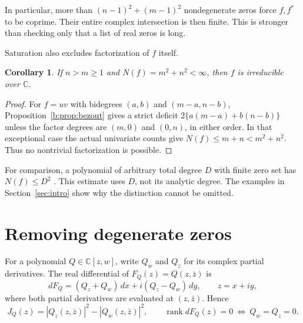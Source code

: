 \documentclass[UTF8,11pt]{ctexart}
\newtheorem{cor}[thm]{Corollary}
\theoremstyle{definition}
\numberwithin{equation}{section}
\newcommand{\C}{\mathbb C}\newcommand{\R}{\mathbb R}
\newcommand{\dd}{\,d}\newcommand{\av}{\textup{author version}}
\DeclareMathOperator{\rank}{rank}\DeclareMathOperator{\tr}{tr}\DeclareMathOperator{\Tr}{Tr}
\begin{document}
In particular, more than $(n-1)^2+(m-1)^2$ nondegenerate zeros force $f,f^*$ to be coprime. Their entire complex intersection is then finite. This is stronger than checking only that a list of real zeros is long.

Saturation also excludes factorization of $f$ itself.
\begin{cor}\label{b:cor:irreducible}
If $n>m\ge1$ and $N(f)=m^2+n^2<\infty$, then $f$ is irreducible over $\C$.
\end{cor}
\begin{proof}
For $f=uv$ with bidegrees $(a,b)$ and $(m-a,n-b)$, Proposition~\ref{b:prop:bezout} gives a strict deficit $2\{a(m-a)+b(n-b)\}$ unless the factor degrees are $(m,0)$ and $(0,n)$, in either order. In that exceptional case the actual univariate counts give $N(f)\le m+n<m^2+n^2$. Thus no nontrivial factorization is possible.
\end{proof}

For comparison, a polynomial of arbitrary total degree $D$ with finite zero set has $N(f)\le D^2$ \cite[Theorem~2.12, p.~6]{SZ24}. This estimate uses $D$, not its analytic degree. The examples in Section~\ref{sec:intro} show why the distinction cannot be omitted.

\section{Removing degenerate zeros}\label{b:sec:regularization}

For a polynomial $Q\in\C[z,w]$, write $Q_w$ and $Q_z$ for its complex
partial derivatives. The real differential of $F_Q(z)=Q(z,\bar z)$ is
\[
 dF_Q=(Q_z+Q_w)\dd x+i(Q_z-Q_w)\dd y,\qquad z=x+iy,
\]
where both partial derivatives are evaluated at $(z,\bar z)$. Hence
\begin{equation}\label{b:eq:jacobian}
 J_Q(z)=|Q_z(z,\bar z)|^2-|Q_w(z,\bar z)|^2,
 \qquad
 \rank dF_Q(z)=0\ \Longleftrightarrow\ Q_w=Q_z=0.
\end{equation}
\end{document}
